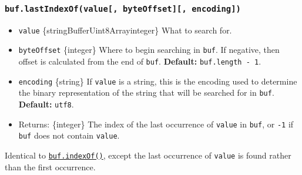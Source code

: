 \subsubsection{\texorpdfstring{\texttt{buf.lastIndexOf(value{[},\ byteOffset{]}{[},\ encoding{]})}}{buf.lastIndexOf(value{[}, byteOffset{]}{[}, encoding{]})}}\label{buf.lastindexofvalue-byteoffset-encoding}

\begin{itemize}
\tightlist
\item
  \texttt{value}
  \{string\textbar Buffer\textbar Uint8Array\textbar integer\} What to
  search for.
\item
  \texttt{byteOffset} \{integer\} Where to begin searching in
  \texttt{buf}. If negative, then offset is calculated from the end of
  \texttt{buf}. \textbf{Default:} \texttt{buf.length\ -\ 1}.
\item
  \texttt{encoding} \{string\} If \texttt{value} is a string, this is
  the encoding used to determine the binary representation of the string
  that will be searched for in \texttt{buf}. \textbf{Default:}
  \texttt{\textquotesingle{}utf8\textquotesingle{}}.
\item
  Returns: \{integer\} The index of the last occurrence of
  \texttt{value} in \texttt{buf}, or \texttt{-1} if \texttt{buf} does
  not contain \texttt{value}.
\end{itemize}

Identical to
\hyperref[bufindexofvalue-byteoffset-encoding]{\texttt{buf.indexOf()}},
except the last occurrence of \texttt{value} is found rather than the
first occurrence.

